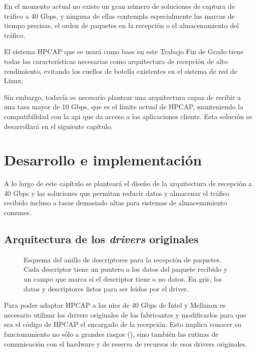 \documentclass[twoside, 12pt]{epstfg}
\begin{document}
En el momento actual no existe un gran número de soluciones de captura de tráfico a 40 Gbps, y ninguna de ellas contempla especialmente las marcas de tiempo precisas, el orden de paquetes en la recepción o el almacenamiento del tráfico.

El sistema HPCAP que se usará como base en este Trabajo Fin de Grado tiene todas las características necesarias como arquitectura de recepción de alto rendimiento, evitando los cuellos de botella existentes en el sistema de red de Linux.

Sin embargo, todavía es necesario plantear una arquitectura capaz de recibir a una tasa mayor de 10 Gbps, que es el límite actual de HPCAP, manteniendo la compatibilidad con la \gls{api} que da acceso a las aplicaciones cliente. Esta solución se desarrollará en el siguiente capítulo.

\chapter{Desarrollo e implementación}
\label{chap:Desarrollo}

A lo largo de este capítulo se planteará el diseño de la arquitectura de recepción a 40 Gbps y las soluciones que permitan reducir datos y almacenar el tráfico recibido incluso a tasas demasiado altas para sistemas de almacenamiento comunes.

\section{Arquitectura de los \textit{drivers} originales}
\label{sec:Desarrollo:ArquitecturaOriginal}

\begin{figure}[btp]
\centering

\caption[Esquema del anillo de descriptores para recepción de paquetes]{Esquema del anillo de descriptores para la recepción de paquetes. Cada descriptor tiene un puntero a los datos del paquete recibido y un campo que marca si el descriptor tiene o no datos. En gris, los datos y descriptores listos para ser leídos por el \gls{driver}.}
\label{fig:Desarrollo:DriverRings}
\end{figure}

Para poder adaptar HPCAP a las \glspl{nic} de 40 Gbps de Intel y Mellanox es necesario utilizar los \glspl{driver} originales de los fabricantes y modificarlos para que sea el código de HPCAP el encargado de la recepción. Esto implica conocer su funcionamiento no sólo a grandes rasgos (), sino también las rutinas de comunicación con el hardware y de reserva de recursos de esos \glspl{driver} originales.
\end{document}
